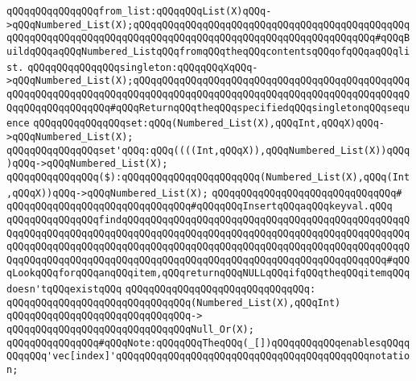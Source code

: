 \newline
\verb|qQQqqQQqqQQqqQQqfrom_list:qQQqqQQqList(X)qQQq->qQQqNumbered_List(X);qQQqqQQqqQQqqQQqqQQqqQQqqQQqqQQqqQQqqQQqqQQqqQQqqQQqqQQqqQQqqQQqqQQqqQQqqQQqqQQqqQQqqQQqqQQqqQQqqQQqqQQqqQQqqQQq#qQQqBuildqQQqaqQQqNumbered_ListqQQqfromqQQqtheqQQqcontentsqQQqofqQQqaqQQqlist.|\newline
\verb|qQQqqQQqqQQqqQQqsingleton:qQQqqQQqXqQQq->qQQqNumbered_List(X);qQQqqQQqqQQqqQQqqQQqqQQqqQQqqQQqqQQqqQQqqQQqqQQqqQQqqQQqqQQqqQQqqQQqqQQqqQQqqQQqqQQqqQQqqQQqqQQqqQQqqQQqqQQqqQQqqQQqqQQqqQQqqQQqqQQqqQQq#qQQqReturnqQQqtheqQQqspecifiedqQQqsingletonqQQqsequence|\newline
\newline
\newline
\verb|qQQqqQQqqQQqqQQqset:qQQq(Numbered_List(X),qQQqInt,qQQqX)qQQq->qQQqNumbered_List(X);|\newline
\verb|qQQqqQQqqQQqqQQqset'qQQq:qQQq((((Int,qQQqX)),qQQqNumbered_List(X))qQQq)qQQq->qQQqNumbered_List(X);|\newline
\verb|qQQqqQQqqQQqqQQq($):qQQqqQQqqQQqqQQqqQQqqQQq(Numbered_List(X),qQQq(Int,qQQqX))qQQq->qQQqNumbered_List(X);|\newline
\verb|qQQqqQQqqQQqqQQqqQQqqQQqqQQqqQQq#|\newline
\verb|qQQqqQQqqQQqqQQqqQQqqQQqqQQqqQQq#qQQqqQQqInsertqQQqaqQQqkeyval.qQQq|\newline
\newline
\verb|qQQqqQQqqQQqqQQqfindqQQqqQQqqQQqqQQqqQQqqQQqqQQqqQQqqQQqqQQqqQQqqQQqqQQqqQQqqQQqqQQqqQQqqQQqqQQqqQQqqQQqqQQqqQQqqQQqqQQqqQQqqQQqqQQqqQQqqQQqqQQqqQQqqQQqqQQqqQQqqQQqqQQqqQQqqQQqqQQqqQQqqQQqqQQqqQQqqQQqqQQqqQQqqQQqqQQqqQQqqQQqqQQqqQQqqQQqqQQqqQQqqQQqqQQqqQQqqQQqqQQqqQQqqQQqqQQq#qQQqLookqQQqforqQQqanqQQqitem,qQQqreturnqQQqNULLqQQqifqQQqtheqQQqitemqQQqdoesn'tqQQqexistqQQq|\newline
\verb|qQQqqQQqqQQqqQQqqQQqqQQqqQQqqQQq:|\newline
\verb|qQQqqQQqqQQqqQQqqQQqqQQqqQQqqQQq(Numbered_List(X),qQQqInt)|\newline
\verb|qQQqqQQqqQQqqQQqqQQqqQQqqQQqqQQq->|\newline
\verb|qQQqqQQqqQQqqQQqqQQqqQQqqQQqqQQqNull_Or(X);|\newline
\newline
\verb|qQQqqQQqqQQqqQQq#qQQqNote:qQQqqQQqTheqQQq(_[])qQQqqQQqqQQqenablesqQQqqQQqqQQq'vec[index]'qQQqqQQqqQQqqQQqqQQqqQQqqQQqqQQqqQQqqQQqqQQqnotation;|\newline
\newline
